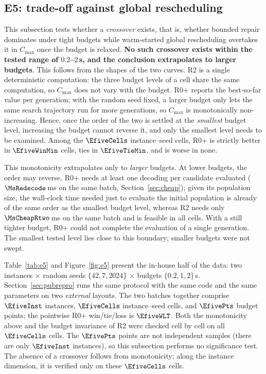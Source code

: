 \subsection{E5: trade-off against global rescheduling}
\label{sec:e5}

This subsection tests whether a \emph{crossover} exists, that is, whether bounded repair dominates under tight budgets while warm-started global rescheduling
overtakes it in \(C_{\max}\) once the budget is relaxed. \textbf{No such crossover exists within the tested range of \(0.2\)--\(2\)\,s,
and the conclusion extrapolates to larger budgets}. This follows from the shapes of the two curves. R2 is a single deterministic computation:
the three budget levels of a cell share the same computation, so \(C_{\max}\) does not vary with the budget. R0+ reports the best-so-far value per generation;
with the random seed fixed, a larger budget only lets the same search trajectory run for more generations, so \(C_{\max}\) is monotonically non-increasing.
Hence, once the order of the two is settled at the \emph{smallest} budget level, increasing the budget cannot reverse it,
and only the smallest level needs to be examined. Among the \(\EfiveCells\) instance--seed cells, R0+ is strictly
better in \(\EfiveWinMin\) cells, ties in \(\EfiveTieMin\), and is worse in none.

This monotonicity extrapolates only to \emph{larger} budgets. At lower budgets, the order may reverse. R0+ needs at least one decoding per candidate evaluated
(\(\MsRedecode\)\,ms on the same batch, Section~\ref{sec:cheap}); given its population size, the
wall-clock time needed just to evaluate the initial population is already of the same order as the smallest budget level, whereas R2 needs only \(\MsCheapRtwo\)\,ms on the same batch and is feasible in all cells.
With a still tighter budget, R0+ could not complete the evaluation of a single generation. The smallest tested level lies close to this boundary; smaller budgets were not swept.

Table~\ref{tab:e5} and Figure~\ref{fig:e5} present the in-house half of the data: two instances \(\times\) random seeds
\(\{42,7,2024\}\) \(\times\) budgets \(\{0.2,1,2\}\)\,s. Section~\ref{sec:pubrepro} runs the same protocol with the same code and the same parameters on two \emph{external}
layouts. The two batches together comprise \(\EfiveInst\) instances,
\(\EfiveCells\) instance--seed cells, and \(\EfivePts\) budget points; the pointwise R0+ win/tie/loss is
\(\EfiveWLT\). Both the monotonicity above and the budget invariance of R2 were checked cell by cell on all \(\EfiveCells\) cells.
The \(\EfivePts\) points are not independent samples (there are only \(\EfiveInst\) instances), so this subsection performs no significance test.
The absence of a crossover follows from monotonicity; along the instance dimension, it is verified only on these \(\EfiveCells\) cells.

